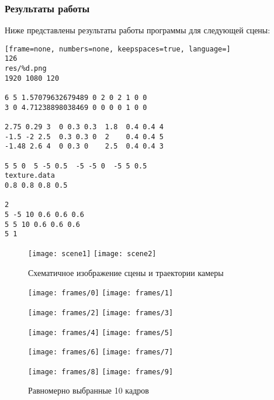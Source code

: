 \subsubsection*{Результаты работы}
Ниже представлены результаты работы программы для следующей сцены:
\begin{lstlisting}[frame=none, numbers=none, keepspaces=true, language=]
126
res/%d.png
1920 1080 120

6 5 1.57079632679489 0 2 0 2 1 0 0
3 0 4.71238898038469 0 0 0 0 1 0 0

2.75 0.29 3  0 0.3 0.3  1.8  0.4 0.4 4
-1.5 -2 2.5  0.3 0.3 0  2    0.4 0.4 5
-1.48 2.6 4  0 0.3 0    2.5  0.4 0.4 3

5 5 0  5 -5 0.5  -5 -5 0  -5 5 0.5
texture.data
0.8 0.8 0.8 0.5

2
5 -5 10 0.6 0.6 0.6
5 5 10 0.6 0.6 0.6
5 1
\end{lstlisting}

\begin{figure}[h!]
\centering
\texttt{[image: scene1]}\hfill
\texttt{[image: scene2]}
\caption{Схематичное изображение сцены и траектории камеры}
\end{figure}

\pagebreak

\begin{figure}[t]
\centering
\texttt{[image: frames/0]}\hfill
\texttt{[image: frames/1]}
\end{figure}

\vfill

\begin{figure}[t]
\centering
\texttt{[image: frames/2]}\hfill
\texttt{[image: frames/3]}
\end{figure}

\vfill

\begin{figure}[t]
\centering
\texttt{[image: frames/4]}\hfill
\texttt{[image: frames/5]}
\end{figure}

\vfill

\begin{figure}[t]
\centering
\texttt{[image: frames/6]}\hfill
\texttt{[image: frames/7]}
\end{figure}

\vfill

\begin{figure}[t]
\centering
\texttt{[image: frames/8]}\hfill
\texttt{[image: frames/9]}
\caption{Равномерно выбранные 10 кадров}
\end{figure}
\FloatBarrier
\pagebreak